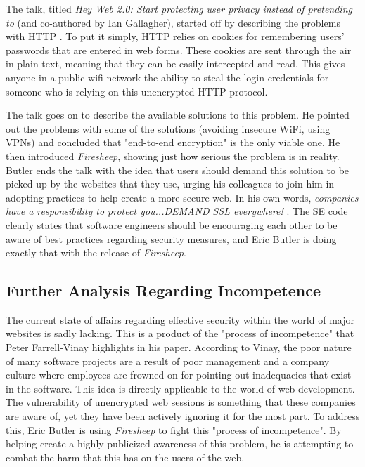 \documentclass[11pt]{article}
\begin{document}
\begin{multicols}{2}
The talk, titled \emph{Hey Web 2.0: Start protecting user privacy instead of pretending to} (and co-authored by Ian Gallagher), started off by describing the problems with HTTP \cite{toorcon_slides}. To put it simply, HTTP relies on cookies for remembering users' passwords that are entered in web forms. These cookies are sent through the air in plain-text, meaning that they can be easily intercepted and read. This gives anyone in a public wifi network the ability to steal the login credentials for someone who is relying on this unencrypted HTTP protocol.

The talk goes on to describe the available solutions to this problem. He pointed out the problems with some of the solutions (avoiding insecure WiFi, using VPNs) and concluded that "end-to-end encryption" is the only viable one. He then introduced \emph{Firesheep}, showing just how serious the problem is in reality. Butler ends the talk with the idea that users should demand this solution to be picked up by the websites that they use, urging his colleagues to join him in adopting practices to help create a more secure web. In his own words, \emph{companies have a responsibility to protect you...DEMAND SSL everywhere!} \cite{toorcon_slides}. The SE code clearly states that software engineers should be encouraging each other to be aware of best practices regarding security measures, and Eric Butler is doing exactly that with the release of \emph{Firesheep}.

\subsection{Further Analysis Regarding Incompetence}
The current state of affairs regarding effective security within the world of major websites is sadly lacking. This is a product of the "process of incompetence" that Peter Farrell-Vinay \cite{incompetence} highlights in his paper. According to Vinay, the poor nature of many software projects are a result of poor management and a company culture where employees are frowned on for pointing out inadequacies that exist in the software. This idea is directly applicable to the world of web development. The vulnerability of unencrypted web sessions is something that these companies are aware of, yet they have been actively ignoring it for the most part. To address this, Eric Butler is using \emph{Firesheep} to fight this "process of incompetence". By helping create a highly publicized awareness of this problem, he is attempting to combat the harm that this has on the users of the web.


\end{multicols}
\end{document}
